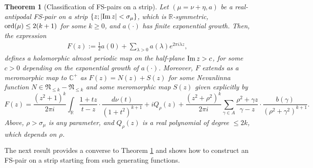 \documentclass[a4paper,reqno,12pt]{amsart}
\newtheorem{theorem}{Theorem}
\newcommand{\NN}{\mathfrak{N}}
\renewcommand{\r}{\mathbb{R}}
\newcommand{\cp}{\mathbb{C}} %
\newcommand{\la}{\lambda}
\newcommand{\ga}{\gamma}
\newcommand{\si}{\sigma}
\newcommand{\ord}{{\rm ord}}
\newcommand{\cd}{\cdot}
\newcommand{\1}{{\bf 1}}
\renewcommand{\Im}{{\rm Im}\,}
\begin{document}
\begin{theorem}[Classification of FS-pairs on a strip]
\label{thm:main}
Let $(\mu=\nu+\eta,a)$ be a real-antipodal FS-pair on a strip $\{z;|\Im{z}|<\si_\mu\}$, which is $\r$-symmetric, $\ord{(\mu)}\leq 2(k+1)$ for some $k\geq0$, and $a(\cd)$ has finite exponential growth. Then, the expression
\begin{align}
F(z):=\frac{1}{2}a(0)+\sum_{\la>0} a(\la)e^{2\pi i\la z},
\end{align}
defines a holomorphic almost periodic map on the half-plane $\Im{z}>c$, for some $c>0$ depending on the exponential growth of $a(\cd)$. Moreover, $F$ extends as a meromorphic map to $\cp^+$ as $F(z)=N(z)+S(z)$ for some Nevanlinna function $N\in\NN_{\leq k}-\NN_{\leq k}$ and some meromorphic map $S(z)$ given explicitly by 
\begin{equation}
\label{eq:F_formula}
F(z)= \frac{(z^2+1)^k}{2\pi i} \int_{\r} \frac{1+tz}{t-z}\cd\frac{d\nu(t)}{(1+t^2)^{k+1}}+iQ_\rho(z)+\frac{(z^2+\rho^2)^k}{2\pi i} \sum_{\ga\in A} \frac{\rho^2+\ga z}{\ga-z}\cd\frac{b(\ga)}{(\rho^2+\ga^2)^{k+1}}.
\end{equation}
Above, $\rho>\si_\mu$ is any parameter, and $Q_\rho(z)$ is a real polynomial of degree $\leq 2k$, which depends on $\rho$.
\end{theorem}
The next result provides a converse to Theorem \ref{thm:main} and shows how to construct an FS-pair on a strip starting from such generating functions.
\end{document}

